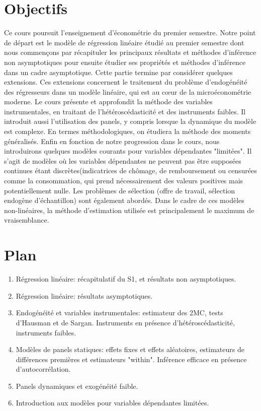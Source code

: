 \newpage

\tableofcontents

\newpage

\section{Objectifs}
 Ce cours poursuit l'enseignement d'économétrie du premier semestre. Notre point de départ est le modèle de 
 régression linéaire étudié au premier semestre dont nous commençons par récapituler les principaux résultats 
 et méthodes d'inférence non asymptotiques pour ensuite étudier ses propriétés et méthodes d'inférence
 dans un cadre asymptotique. Cette partie termine par considérer quelques extensions. 
 Ces extensions concernent le traitement du problème d'endogénéité des régresseurs dans un modèle linéaire, 
 qui est au cœur de la microéconométrie moderne. 
 Le cours présente et approfondit la méthode des variables instrumentales, en traitant de l'hétéroscédasticité et des instruments faibles. 
 Il introduit aussi l'utilisation des panels, y compris lorsque la dynamique du modèle est complexe. 
 En termes méthodologiques, on étudiera  la méthode des moments généralisés.
 Enfin en fonction de notre progression dans le cours, nous introduirons quelques  modèles courants pour variables dépendantes 
 "limitées". Il s'agit de modèles où les variables dépendantes ne peuvent pas être supposées continues étant discrètes(indicatrices de chômage, de remboursement 
ou censurées comme la consommation, qui prend nécessairement des valeurs positives mais potentiellement nulle. 
Les problèmes de sélection (offre de travail, sélection endogène d'échantillon) sont également abordés. 
Dans le cadre de ces modèles non-linéaires, la méthode d'estimation utilisée est principalement 
le maximum de vraisemblance.

\section{Plan}
 
\begin{enumerate}
 \item Régression linéaire:  récapitulatif du S1, et résultats non asymptotiques.
 \item Régression linéaire: résultats asymptotiques.
 \item Endogénéité et variables instrumentales: estimateur des 2MC, tests d'Hausman et de Sargan.
Instruments en présence d'hétéroscédasticité, instruments faibles.
\item Modèles de panels statiques: effets fixes et effets aléatoires, estimateurs de différences premières 
et estimateurs "within". Inférence efficace en présence d'autocorrélation.
\item Panels dynamiques et exogénéité faible.
\item Introduction aux modèles pour variables dépendantes limitées.
\end{enumerate}


